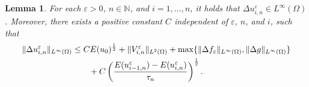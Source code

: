 \documentclass[12pt]{amsart}
\newtheorem{lem}{Lemma}[section]
\begin{document}
\begin{lem} \label{Lap-bdd}
For each ${\varepsilon}>0$, $n \in {\mathbb{N}}$, and $i=1, \ldots, n$, it holds that $\Delta u^{\varepsilon}_{i,n} \in L^{\infty}(\Omega)$. 
Moreover, there exists a positive constant $C$ independent of ${\varepsilon}$, $n$, and $i$, such that 
\begin{align} \label{pre-Li-Delta-u}
\| \Delta u^{\varepsilon}_{i,n} \|_{L^{\infty}(\Omega)}  
&\le C E(u_0)^{\frac{1}{2}} + \| V^{\varepsilon}_{i,n} \|_{L^2(\Omega)} 
        + \max\{ \| \Delta f_{\varepsilon} \|_{L^\infty(\Omega)}, \| \Delta g \|_{L^\infty(\Omega)} \} \\
& \qquad + C \left( \dfrac{E(u^{\varepsilon}_{i-1,n}) - E(u^{\varepsilon}_{i,n})}{\tau_n} \right)^{\frac{1}{2}}. \notag
\end{align}
\end{lem}
\end{document}
